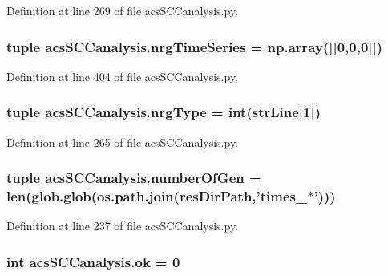 Definition at line 269 of file acs\-S\-C\-Canalysis.\-py.

\hypertarget{a00128_ad4d4abc783f2f7f8d1084b1144b4fe2f}{
\subsubsection[{nrg\-Time\-Series}]{\setlength{\rightskip}{0pt plus 5cm}tuple acs\-S\-C\-Canalysis.\-nrg\-Time\-Series = np.\-array(\mbox{[}\mbox{[}0,0,0\mbox{]}\mbox{]})}}\label{a00128_ad4d4abc783f2f7f8d1084b1144b4fe2f}


Definition at line 404 of file acs\-S\-C\-Canalysis.\-py.

\hypertarget{a00128_a0d0c83fd90489be59b1f5a31dadf4469}{
\subsubsection[{nrg\-Type}]{\setlength{\rightskip}{0pt plus 5cm}tuple acs\-S\-C\-Canalysis.\-nrg\-Type = int({\bf str\-Line}\mbox{[}1\mbox{]})}}\label{a00128_a0d0c83fd90489be59b1f5a31dadf4469}


Definition at line 265 of file acs\-S\-C\-Canalysis.\-py.

\hypertarget{a00128_a9a81829f850e2e125e3c94214da7a1f0}{
\subsubsection[{number\-Of\-Gen}]{\setlength{\rightskip}{0pt plus 5cm}tuple acs\-S\-C\-Canalysis.\-number\-Of\-Gen = len(glob.\-glob(os.\-path.\-join({\bf res\-Dir\-Path},'times\-\_\-$\ast$')))}}\label{a00128_a9a81829f850e2e125e3c94214da7a1f0}


Definition at line 237 of file acs\-S\-C\-Canalysis.\-py.

\hypertarget{a00128_a9ce833d782f17d858941cfa76914599a}{
\subsubsection[{ok}]{\setlength{\rightskip}{0pt plus 5cm}int acs\-S\-C\-Canalysis.\-ok = 0}}\label{a00128_a9ce833d782f17d858941cfa76914599a}


